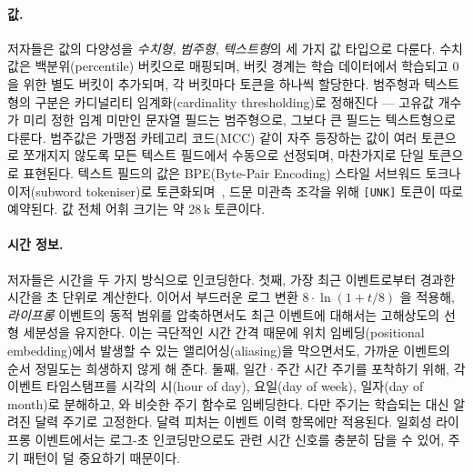 \paragraph*{값.}
저자들은 값의 다양성을 \emph{수치형}, \emph{범주형}, \emph{텍스트형}의 세 가지 값 타입으로 다룬다.
수치값은 백분위(percentile) 버킷으로 매핑되며, 버킷 경계는 학습 데이터에서 학습되고 0을 위한 별도 버킷이 추가되며, 각 버킷마다 토큰을 하나씩 할당한다.
범주형과 텍스트형의 구분은 카디널리티 임계화(cardinality thresholding)로 정해진다 — 고유값 개수가 미리 정한 임계 미만인 문자열 필드는 범주형으로, 그보다 큰 필드는 텍스트형으로 다룬다.
범주값은 가맹점 카테고리 코드(MCC) 같이 자주 등장하는 값이 여러 토큰으로 쪼개지지 않도록 모든 텍스트 필드에서 수동으로 선정되며, 마찬가지로 단일 토큰으로 표현된다.
텍스트 필드의 값은 BPE(Byte-Pair Encoding) 스타일 서브워드 토크나이저(subword tokeniser)로 토큰화되며~\citep{sennrich2016neural}, 드문 미관측 조각을 위해 \texttt{[UNK]} 토큰이 따로 예약된다.
값 전체 어휘 크기는 약 28\,k 토큰이다.

\paragraph*{시간 정보.}
저자들은 시간을 두 가지 방식으로 인코딩한다.
첫째, 가장 최근 이벤트로부터 경과한 시간을 초 단위로 계산한다.
이어서 부드러운 로그 변환 $8\cdot\ln(1+t/8)$ 을 적용해, \emph{라이프롱} 이벤트의 동적 범위를 압축하면서도 최근 이벤트에 대해서는 고해상도의 선형 세분성을 유지한다.
이는 극단적인 시간 간격 때문에 위치 임베딩(positional embedding)에서 발생할 수 있는 앨리어싱(aliasing)을 막으면서도, 가까운 이벤트의 순서 정밀도는 희생하지 않게 해 준다.
둘째, 일간·주간 시간 주기를 포착하기 위해, 각 이벤트 타임스탬프를 시각의 시(hour of day), 요일(day of week), 일자(day of month)로 분해하고, \citet{gorishniy2022embeddings}와 비슷한 주기 함수로 임베딩한다. 다만 주기는 학습되는 대신 알려진 달력 주기로 고정한다.
달력 피처는 이벤트 이력 항목에만 적용된다. 일회성 라이프롱 이벤트에서는 로그-초 인코딩만으로도 관련 시간 신호를 충분히 담을 수 있어, 주기 패턴이 덜 중요하기 때문이다.
